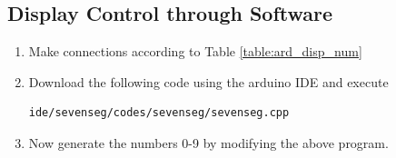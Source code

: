 \subsection{Display Control through Software}
\begin{enumerate}[label=\arabic*.,ref=\theenumi]
\item
Make connections according to Table \ref{table:ard_disp_num}
\begin{table}
\centering

\caption{}
\label{table:ard_disp_num}
\end{table}

\item
Download the following code using the arduino IDE and execute
%
\begin{lstlisting}
ide/sevenseg/codes/sevenseg/sevenseg.cpp
\end{lstlisting}
%
\item
Now generate the numbers 0-9 by modifying the above program.

\end{enumerate}



